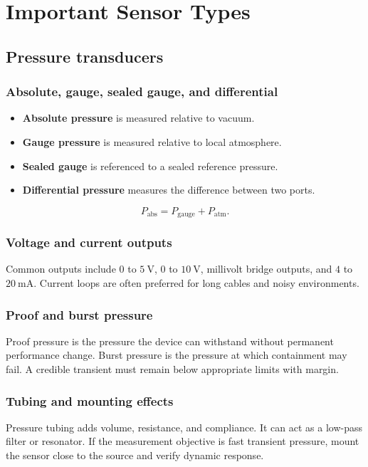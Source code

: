 \documentclass[11pt]{article}
\newcommand{\V}{\mathrm{V}}
\newcommand{\mA}{\mathrm{mA}}
\begin{document}
\section{Important Sensor Types}

\subsection{Pressure transducers}
\subsubsection{Absolute, gauge, sealed gauge, and differential}
\begin{itemize}
  \item \textbf{Absolute pressure} is measured relative to vacuum.
  \item \textbf{Gauge pressure} is measured relative to local atmosphere.
  \item \textbf{Sealed gauge} is referenced to a sealed reference pressure.
  \item \textbf{Differential pressure} measures the difference between two ports.
\end{itemize}

\[
P_{\mathrm{abs}} = P_{\mathrm{gauge}} + P_{\mathrm{atm}}.
\]

\subsubsection{Voltage and current outputs}
Common outputs include \(0\) to \(5~\V\), \(0\) to \(10~\V\), millivolt bridge
outputs, and \(4\) to \(20~\mA\). Current loops are often preferred for long
cables and noisy environments.

\subsubsection{Proof and burst pressure}
Proof pressure is the pressure the device can withstand without permanent
performance change. Burst pressure is the pressure at which containment may
fail. A credible transient must remain below appropriate limits with margin.

\subsubsection{Tubing and mounting effects}
Pressure tubing adds volume, resistance, and compliance. It can act as a low-pass
filter or resonator. If the measurement objective is fast transient pressure,
mount the sensor close to the source and verify dynamic response.
\end{document}
